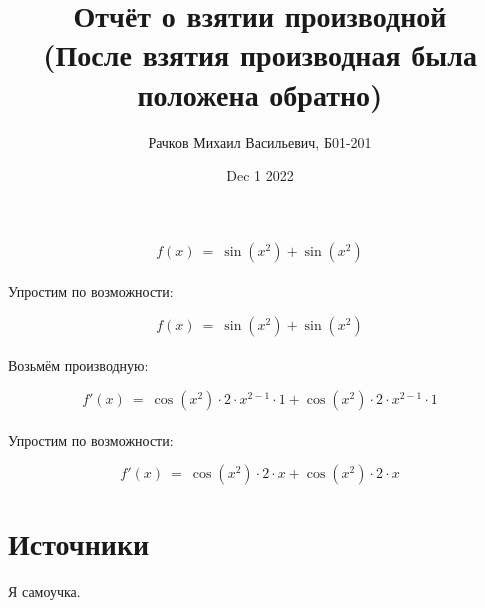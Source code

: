 \documentclass[a4paper, 12pt]{article}
\author{Рачков Михаил Васильевич, Б01-201}
\date{Dec  1 2022}
\title{\textbf{Отчёт о взятии производной} \\(После взятия производная была положена обратно)}
\begin{document}
        \maketitle 
            \maketitle
            \begin{equation}
            f(x)~=~ \sin (x ^ {2}) +  \sin (x ^ {2})
    \end{equation}
    \\ Упростим по возможности: \\
            \maketitle
            \begin{equation}
            f(x)~=~ \sin (x ^ {2}) +  \sin (x ^ {2})
    \end{equation}
    \\ Возьмём производную: \\
            \maketitle
            \begin{equation}
            f'(x)~=~ \cos (x ^ {2}) \cdot 2 \cdot x ^ {2 - 1} \cdot 1 +  \cos (x ^ {2}) \cdot 2 \cdot x ^ {2 - 1} \cdot 1
    \end{equation}
    \\ Упростим по возможности: \\
            \maketitle
            \begin{equation}
            f'(x)~=~ \cos (x ^ {2}) \cdot 2 \cdot x +  \cos (x ^ {2}) \cdot 2 \cdot x
    \end{equation}
    
    \section{Источники}
    Я самоучка.
    
    
\end{document}
